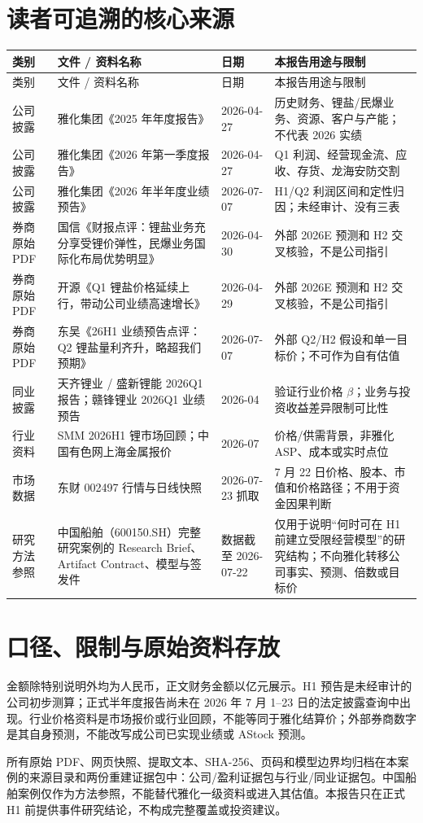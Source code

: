 \section{读者可追溯的核心来源}

\begin{longtable}{L{2.0cm}L{5.4cm}L{2.2cm}L{4.4cm}}
\toprule
类别 & 文件 / 资料名称 & 日期 & 本报告用途与限制 \\
\midrule
\endfirsthead
\toprule
类别 & 文件 / 资料名称 & 日期 & 本报告用途与限制 \\
\midrule
\endhead
公司披露 & 雅化集团《2025 年年度报告》 & 2026-04-27 & 历史财务、锂盐/民爆业务、资源、客户与产能；不代表 2026 实绩 \\
公司披露 & 雅化集团《2026 年第一季度报告》 & 2026-04-27 & Q1 利润、经营现金流、应收、存货、龙海安防交割 \\
公司披露 & 雅化集团《2026 年半年度业绩预告》 & 2026-07-07 & H1/Q2 利润区间和定性归因；未经审计、没有三表 \\
券商原始 PDF & 国信《财报点评：锂盐业务充分享受锂价弹性，民爆业务国际化布局优势明显》 & 2026-04-30 & 外部 2026E 预测和 H2 交叉核验，不是公司指引 \\
券商原始 PDF & 开源《Q1 锂盐价格延续上行，带动公司业绩高速增长》 & 2026-04-29 & 外部 2026E 预测和 H2 交叉核验，不是公司指引 \\
券商原始 PDF & 东吴《26H1 业绩预告点评：Q2 锂盐量利齐升，略超我们预期》 & 2026-07-07 & 外部 Q2/H2 假设和单一目标价；不可作为自有估值 \\
同业披露 & 天齐锂业 / 盛新锂能 2026Q1 报告；赣锋锂业 2026Q1 业绩预告 & 2026-04 & 验证行业价格 $\beta$；业务与投资收益差异限制可比性 \\
行业资料 & SMM 2026H1 锂市场回顾；中国有色网上海金属报价 & 2026-07 & 价格/供需背景，非雅化 ASP、成本或实时点位 \\
市场数据 & 东财 002497 行情与日线快照 & 2026-07-23 抓取 & 7 月 22 日价格、股本、市值和价格路径；不用于资金因果判断 \\
研究方法参照 & 中国船舶（600150.SH）完整研究案例的 Research Brief、Artifact Contract、模型与签发件 & 数据截至 2026-07-22 & 仅用于说明“何时可在 H1 前建立受限经营模型”的研究结构；不向雅化转移公司事实、预测、倍数或目标价 \\
\bottomrule
\end{longtable}

\section{口径、限制与原始资料存放}

金额除特别说明外均为人民币，正文财务金额以亿元展示。H1 预告是未经审计的公司初步测算；正式半年度报告尚未在 2026 年 7 月 1--23 日的法定披露查询中出现。行业价格资料是市场报价或行业回顾，不能等同于雅化结算价；外部券商数字是其自身预测，不能改写成公司已实现业绩或 AStock 预测。

所有原始 PDF、网页快照、提取文本、SHA-256、页码和模型边界均归档在本案例的来源目录和两份重建证据包中：公司/盈利证据包与行业/同业证据包。中国船舶案例仅作为方法参照，不能替代雅化一级资料或进入其估值。本报告只在正式 H1 前提供事件研究结论，不构成完整覆盖或投资建议。
